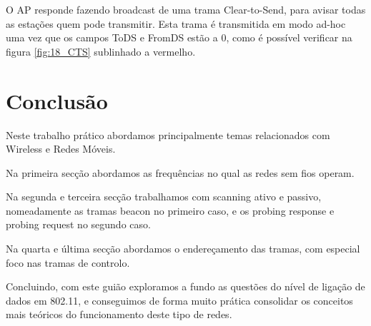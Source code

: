 \documentclass{llncs}
\begin{document}
O AP responde fazendo broadcast de uma trama Clear-to-Send, para avisar todas as estações quem pode transmitir. Esta trama é transmitida em modo ad-hoc uma vez que os campos ToDS e FromDS estão a 0, como é possível verificar na figura \ref{fig:18_CTS} sublinhado a vermelho.


\section{Conclusão}
Neste trabalho prático abordamos principalmente temas relacionados com Wireless e Redes Móveis.

Na primeira secção abordamos as frequências no qual as redes sem fios operam.

Na segunda e terceira secção trabalhamos com scanning ativo e passivo, nomeadamente as tramas beacon no primeiro caso, e os probing response e probing request no segundo caso.

Na quarta e última secção abordamos o endereçamento das tramas, com especial foco nas tramas de controlo.

Concluindo, com este guião exploramos a fundo as questões do nível de ligação de
dados em 802.11, e conseguimos de forma muito prática consolidar os conceitos mais teóricos do funcionamento
deste tipo de redes.
\end{document}
